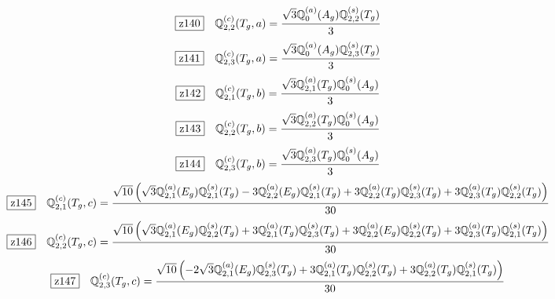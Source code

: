 \documentclass[fleqn,10pt,landscape]{jsarticle}
\begin{document}
\begin{dmath*}
\hspace*{3mm}\fbox{z140}\quad \mathbb{Q}_{2,2}^{(c)}(T_{g},a)=\frac{\sqrt{3} \mathbb{Q}_{0}^{(a)}(A_{g}) \mathbb{Q}_{2,2}^{(s)}(T_{g})}{3}
\end{dmath*}
\begin{dmath*}
\hspace*{3mm}\fbox{z141}\quad \mathbb{Q}_{2,3}^{(c)}(T_{g},a)=\frac{\sqrt{3} \mathbb{Q}_{0}^{(a)}(A_{g}) \mathbb{Q}_{2,3}^{(s)}(T_{g})}{3}
\end{dmath*}
\begin{dmath*}
\hspace*{3mm}\fbox{z142}\quad \mathbb{Q}_{2,1}^{(c)}(T_{g},b)=\frac{\sqrt{3} \mathbb{Q}_{2,1}^{(a)}(T_{g}) \mathbb{Q}_{0}^{(s)}(A_{g})}{3}
\end{dmath*}
\begin{dmath*}
\hspace*{3mm}\fbox{z143}\quad \mathbb{Q}_{2,2}^{(c)}(T_{g},b)=\frac{\sqrt{3} \mathbb{Q}_{2,2}^{(a)}(T_{g}) \mathbb{Q}_{0}^{(s)}(A_{g})}{3}
\end{dmath*}
\begin{dmath*}
\hspace*{3mm}\fbox{z144}\quad \mathbb{Q}_{2,3}^{(c)}(T_{g},b)=\frac{\sqrt{3} \mathbb{Q}_{2,3}^{(a)}(T_{g}) \mathbb{Q}_{0}^{(s)}(A_{g})}{3}
\end{dmath*}
\begin{dmath*}
\hspace*{3mm}\fbox{z145}\quad \mathbb{Q}_{2,1}^{(c)}(T_{g},c)=\frac{\sqrt{10} \left(\sqrt{3} \mathbb{Q}_{2,1}^{(a)}(E_{g}) \mathbb{Q}_{2,1}^{(s)}(T_{g}) - 3 \mathbb{Q}_{2,2}^{(a)}(E_{g}) \mathbb{Q}_{2,1}^{(s)}(T_{g}) + 3 \mathbb{Q}_{2,2}^{(a)}(T_{g}) \mathbb{Q}_{2,3}^{(s)}(T_{g}) + 3 \mathbb{Q}_{2,3}^{(a)}(T_{g}) \mathbb{Q}_{2,2}^{(s)}(T_{g})\right)}{30}
\end{dmath*}
\begin{dmath*}
\hspace*{3mm}\fbox{z146}\quad \mathbb{Q}_{2,2}^{(c)}(T_{g},c)=\frac{\sqrt{10} \left(\sqrt{3} \mathbb{Q}_{2,1}^{(a)}(E_{g}) \mathbb{Q}_{2,2}^{(s)}(T_{g}) + 3 \mathbb{Q}_{2,1}^{(a)}(T_{g}) \mathbb{Q}_{2,3}^{(s)}(T_{g}) + 3 \mathbb{Q}_{2,2}^{(a)}(E_{g}) \mathbb{Q}_{2,2}^{(s)}(T_{g}) + 3 \mathbb{Q}_{2,3}^{(a)}(T_{g}) \mathbb{Q}_{2,1}^{(s)}(T_{g})\right)}{30}
\end{dmath*}
\begin{dmath*}
\hspace*{3mm}\fbox{z147}\quad \mathbb{Q}_{2,3}^{(c)}(T_{g},c)=\frac{\sqrt{10} \left(- 2 \sqrt{3} \mathbb{Q}_{2,1}^{(a)}(E_{g}) \mathbb{Q}_{2,3}^{(s)}(T_{g}) + 3 \mathbb{Q}_{2,1}^{(a)}(T_{g}) \mathbb{Q}_{2,2}^{(s)}(T_{g}) + 3 \mathbb{Q}_{2,2}^{(a)}(T_{g}) \mathbb{Q}_{2,1}^{(s)}(T_{g})\right)}{30}
\end{dmath*}
\end{document}
